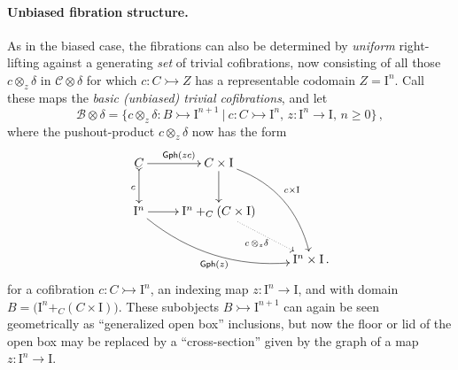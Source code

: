 \documentclass[12pt]{article}
\newcommand{\mono}{\ensuremath{\rightarrowtail}}
\newcommand{\ra}{\ensuremath{\rightarrow}}
\newcommand{\I}{\ensuremath{\mathrm{I}}}
\theoremstyle{remark}
\theoremstyle{definition}
\begin{document}
\paragraph{Unbiased fibration structure.}

As in the biased case, the fibrations can also be determined by \emph{uniform} right-lifting against a generating \emph{set} of trivial cofibrations, now consisting of all those $c \otimes_z \delta$ in $\mathcal{C}\otimes \delta$ for which $c : C \mono Z$ has a representable codomain $Z=\I^n$.  Call these maps the \emph{basic (unbiased) trivial cofibrations}, and let 
\begin{equation}\label{eq:basicunbiasedTCof}
\mathcal{B}\otimes \delta = \{c \otimes_z \delta : B \mono \I^{n+1}\ |\ c : C\mono \I^n,\, z : \I^n \ra \I,\,n\geq 0\}\,,
\end{equation}
where the pushout-product $c\otimes_z \delta$ now has the form
\begin{equation}\label{diagram:unbiasedbasicpushoutproduct}
\xymatrix{
C \ar@{>->}[d]_{c} \ar[r]^{\mathsf{Gph}(zc)} & C\times \I \ar[d] \ar@/^4ex/ [rdd]^{c\times\I}\\
\I^n \ar@/_4ex/ [rrd]_{\mathsf{Gph}(z)} \ar[r] &  \I^n +_C (C\times\I) \ar@{.>}[rd]_{c\, \otimes_z \delta} \\
&& \I^n\times\I\,.
}
\end{equation}
for a cofibration $c : C\mono \I^n$, an indexing map $z : \I^n \ra \I$, and with domain $B = \big(\I^n +_C (C\times\I)\big)$.   These subobjects $B \mono \I^{n+1}$ can again be seen geometrically as ``generalized open box'' inclusions, but now the floor or lid of the open box may be replaced by a ``cross-section'' given by the graph of a map $z:\I^n\ra \I$.
\end{document}
